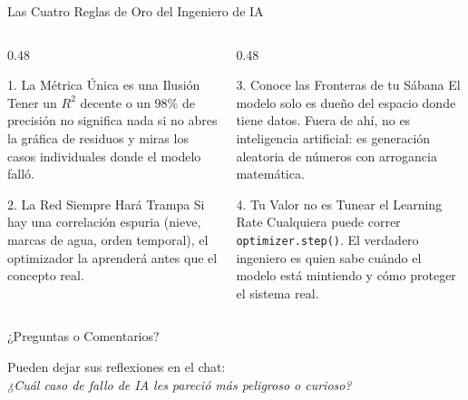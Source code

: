\documentclass[10pt,aspectratio=169]{beamer}
\begin{document}
\begin{frame}{Las Cuatro Reglas de Oro del Ingeniero de IA}
  \begin{columns}[T]
    \begin{column}{0.48\textwidth}
      \begin{block}{1. La Métrica Única es una Ilusión}
        \scriptsize
        Tener un $R^2$ decente o un $98\%$ de precisión no significa nada si no abres la gráfica de residuos y miras los casos individuales donde el modelo falló.
      \end{block}

      \vspace{-0.1cm}
      \begin{block}{2. La Red Siempre Hará Trampa}
        \scriptsize
        Si hay una correlación espuria (nieve, marcas de agua, orden temporal), el optimizador la aprenderá antes que el concepto real.
      \end{block}
    \end{column}

    \begin{column}{0.48\textwidth}
      \begin{block}{3. Conoce las Fronteras de tu Sábana}
        \scriptsize
        El modelo solo es dueño del espacio donde tiene datos. Fuera de ahí, no es inteligencia artificial: es generación aleatoria de números con arrogancia matemática.
      \end{block}

      \vspace{-0.1cm}
      \begin{alertblock}{4. Tu Valor no es Tunear el Learning Rate}
        \scriptsize
        Cualquiera puede correr \texttt{optimizer.step()}. El verdadero ingeniero es quien sabe cuándo el modelo está mintiendo y cómo proteger el sistema real.
      \end{alertblock}
    \end{column}
  \end{columns}
\end{frame}

\begin{frame}[standout]
  \Huge ¿Preguntas o Comentarios?
  \vspace{0.4cm}

  \normalsize Pueden dejar sus reflexiones en el chat: \\
  \textit{¿Cuál caso de fallo de IA les pareció más peligroso o curioso?}
\end{frame}
\end{document}
